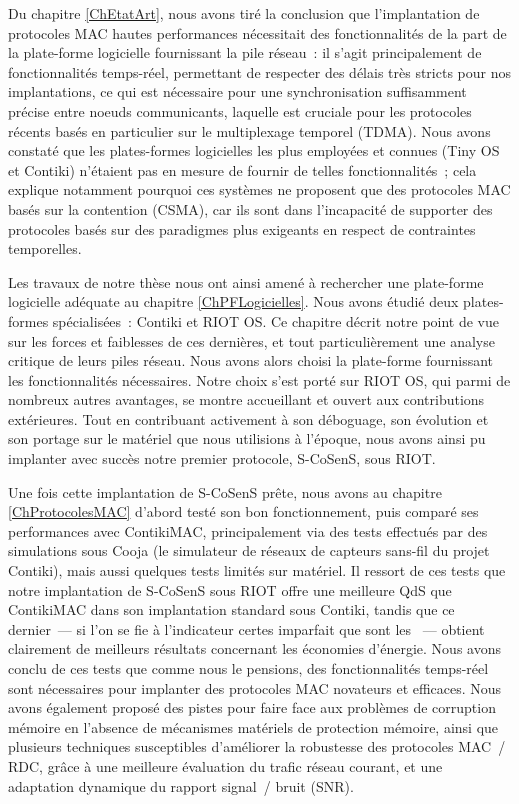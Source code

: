 Du chapitre \ref{ChEtatArt}, nous avons tiré la conclusion que
l'implantation de protocoles MAC hautes performances nécessitait
des fonctionnalités de la part de la plate-forme logicielle fournissant
la pile réseau~: il s'agit principalement de fonctionnalités temps-réel,
permettant de respecter des délais très stricts pour nos implantations,
ce qui est nécessaire pour une synchronisation suffisamment précise
entre noeuds communicants, laquelle est cruciale pour les protocoles
récents basés en particulier sur le multiplexage temporel (TDMA).
Nous avons constaté que les plates-formes logicielles les plus employées
et connues (Tiny OS et Contiki) n'étaient pas en mesure de fournir de
telles fonctionnalités~; cela explique notamment pourquoi ces systèmes
ne proposent que des protocoles MAC basés sur la contention (CSMA),
car ils sont dans l'incapacité de supporter des protocoles basés
sur des paradigmes plus exigeants en respect de contraintes temporelles.

Les travaux de notre thèse nous ont ainsi amené à rechercher une plate-forme
logicielle adéquate au chapitre \ref{ChPFLogicielles}. Nous avons étudié
deux plates-formes spécialisées~: Contiki et RIOT OS. Ce chapitre décrit
notre point de vue sur les forces et faiblesses de ces dernières, et tout
particulièrement une analyse critique de leurs piles réseau. Nous avons
alors choisi la plate-forme fournissant les fonctionnalités nécessaires.
Notre choix s'est porté sur RIOT OS, qui parmi de nombreux autres avantages,
se montre accueillant et ouvert aux contributions extérieures. Tout en
contribuant activement à son déboguage, son évolution et son portage sur
le matériel que nous utilisions à l'époque, nous avons ainsi pu implanter
avec succès notre premier protocole, S-CoSenS, sous RIOT.

Une fois cette implantation de S-CoSenS prête, nous avons au chapitre
\ref{ChProtocolesMAC} d'abord testé son bon fonctionnement, puis comparé ses
performances avec ContikiMAC, principalement via des tests effectués par des
simulations sous Cooja (le simulateur de réseaux de capteurs sans-fil du
projet Contiki), mais aussi quelques tests limités sur matériel. Il ressort
de ces tests que notre implantation de S-CoSenS sous RIOT offre une
meilleure QdS que ContikiMAC dans son implantation standard sous Contiki,
tandis que ce dernier~--- si l'on se fie à l'indicateur certes imparfait que
sont les ~--- obtient clairement de meilleurs
résultats concernant les économies d'énergie. Nous avons conclu de ces tests
que comme nous le pensions, des fonctionnalités temps-réel sont nécessaires
pour implanter des protocoles MAC novateurs et efficaces. Nous avons
également proposé des pistes pour faire face aux problèmes de corruption
mémoire en l'absence de mécanismes matériels de protection mémoire,
ainsi que plusieurs techniques susceptibles d'améliorer la robustesse
des protocoles MAC~/ RDC, grâce à une meilleure évaluation du trafic
réseau courant, et une adaptation dynamique du rapport signal~/
bruit (SNR).

